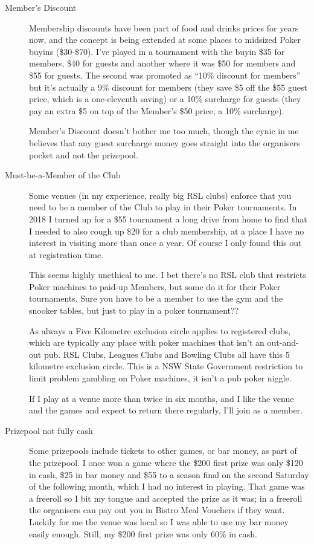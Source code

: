 \begin{description}
\item[Member's Discount] Membership discounts have been part
of food and drinks prices for years now, and the concept
is being extended at some places to midsized Poker buyins
(\$30-\$70). I've played in a tournament with the buyin
\$35 for members, \$40 for guests and another where it was \$50
for members and \$55 for guests. The second was promoted as ``10\%
discount for members'' but it's actually a 9\% discount for members
(they save \$5 off the \$55 guest price, which is a one-eleventh saving)
or a 10\% surcharge for guests (they pay an extra \$5 on top of the
Member's \$50 price, a 10\% surcharge).

Member's Discount doesn't bother me too much, though the
cynic in me believes that any guest surcharge money
goes straight into the organisers pocket and not the prizepool.

\item[Must-be-a-Member of the Club] Some venues (in my experience,
really big RSL clubs) enforce that you need to be a member of the Club
to play in their Poker tournaments. In 2018 I turned up for a \$55
tournament a long drive from home to find that I needed to also cough
up \$20 for a club membership, at a place I have no interest in visiting
more than once a year. Of course I only found this out at registration
time.

This seems highly unethical to me. I bet there's no RSL club that
restricts Poker machines to paid-up Members, but some do it for
their Poker tournaments. Sure you have to be a member to use
the gym and the snooker tables, but just to play in a poker
tournament??

As always a Five Kilometre exclusion circle applies to registered
clubs, which are typically any place with poker machines that isn't an
out-and-out pub. RSL Clubs, Leagues Clubs and Bowling Clubs all have
this 5 kilometre exclusion circle. This is a NSW State Government
restriction to limit problem gambling on Poker machines, it isn't a
pub poker niggle.

If I play at a venue more than twice in six months, and I like the
venue and the games and expect to return there regularly, I'll join as
a member.

\item[Prizepool not fully cash] Some prizepools include tickets
to other games, or bar money, as part of the prizepool. I once won a game
where the \$200 first prize was only \$120 in cash, \$25 in bar money
and \$55 to a season final on the second Saturday of the following month,
which I had no interest in playing. That game was a freeroll so I bit
my tongue and accepted the prize as it was; in a freeroll the organisers
can pay out you in Bistro Meal Vouchers if they want. Luckily for me the venue
was local so I was able to use my bar money easily enough. Still, my
\$200 first prize was only 60\% in cash.


\end{description}
